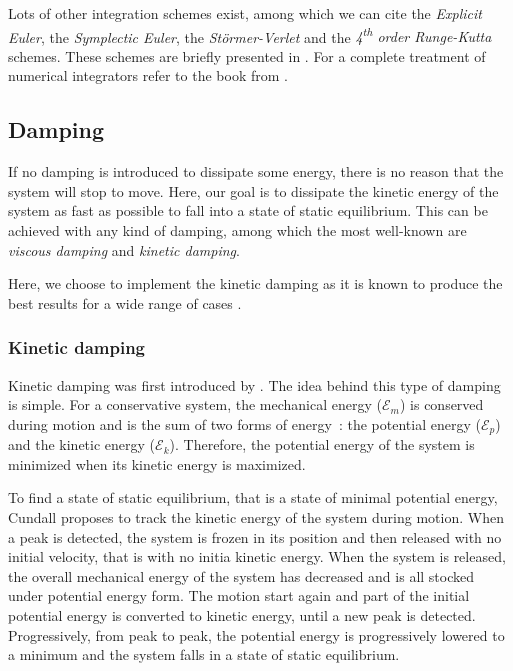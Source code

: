 Lots of other integration schemes exist, among which we can cite the \emph{Explicit Euler}, the \emph{Symplectic Euler}, the \emph{Störmer-Verlet} and the \emph{4\textsuperscript{th} order Runge-Kutta} schemes. These schemes are briefly presented in \cite{Fierz2013}. For a complete treatment of numerical integrators refer to the book from .

\subsection{Damping}\label{sec=damping}
If no damping is introduced to dissipate some energy, there is no reason that the system will stop to move. Here, our goal is to dissipate the kinetic energy of the system as fast as possible to fall into a state of static equilibrium. This can be achieved with any kind of damping, among which the most well-known are \emph{viscous damping} and \emph{kinetic damping}. 

Here, we choose to implement the kinetic damping as it is known to produce the best results for a wide range of cases \cite{Rezaiee2012}.

\subsubsection{Kinetic damping}
Kinetic damping was first introduced by . The idea behind this type of damping is simple. For a conservative system, the mechanical energy ($\mathcal{E}_m$) is conserved during motion and is the sum of two forms of energy~: the potential energy ($\mathcal{E}_p$) and the kinetic energy ($\mathcal{E}_k$). Therefore, the potential energy of the system is minimized when its kinetic energy is maximized.

To find a state of static equilibrium, that is a state of minimal potential energy, Cundall proposes to track the kinetic energy of the system during motion. When a peak is detected, the system is frozen in its position and then released with no initial velocity, that is with no initia kinetic energy. When the system is released, the overall mechanical energy of the system has decreased and is all stocked under potential energy form. The motion start again and part of the initial potential energy is converted to kinetic energy, until a new peak is detected. Progressively, from peak to peak, the potential energy is progressively lowered to a minimum and the system falls in a state of static equilibrium.

